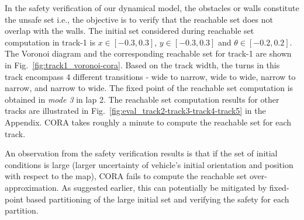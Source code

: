 In the safety verification of our dynamical model, the obstacles or walls constitute the unsafe set i.e., the objective is to verify that the reachable set does not overlap with the walls. 
%
%
The initial set considered during reachable set computation in track-1 is $x \in [-0.3, 0.3]$, $y \in [-0.3, 0.3]$ and $\theta \in [-0.2, 0.2]$.
The Voronoi diagram and the corresponding reachable set for track-1 are shown in Fig.~\ref{fig:track1_voronoi-cora}. Based on the track width, the turns in this track encompass 4 different transitions - wide to narrow, wide to wide, narrow to narrow, and narrow to wide. The fixed point of the reachable set computation is obtained in \emph{mode 3} in lap 2.
%
The reachable set computation results for other tracks are illustrated in Fig.~\ref{fig:eval_track2-track3-track4-track5} in the Appendix. CORA takes roughly a minute to compute the reachable set for each track.


%
%
An observation from the safety verification results is that if the set of initial conditions is large (larger uncertainty of vehicle's initial orientation and position with respect to the map), CORA fails to compute the reachable set over-approximation. 
%
As suggested earlier, this can potentially be mitigated by fixed-point based partitioning of the large initial set and verifying the safety for each partition.

